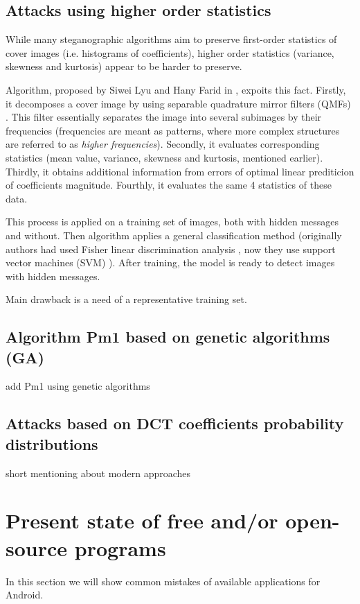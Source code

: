 \subsection{Attacks using higher order statistics}

While many steganographic algorithms aim to preserve first-order statistics of cover images
(i.e. histograms of coefficients), higher order statistics (variance, skewness and kurtosis)
appear to be harder to preserve.

Algorithm, proposed by Siwei Lyu and Hany Farid in \cite{lyu2002detecting}, expoits this fact.
Firstly, it decomposes a cover image by using separable quadrature mirror filters (QMFs) \cite{vaidyanathan1987quadrature}.
This filter essentially separates the image into several subimages by their frequencies (frequencies are meant as patterns,
where more complex structures are referred to as \emph{higher frequencies}).
Secondly, it evaluates corresponding statistics (mean value, variance, skewness and kurtosis, mentioned earlier).
Thirdly, it obtains additional information from errors of optimal linear prediticion of coefficients magnitude.
Fourthly, it evaluates the same 4 statistics of these data.

This process is applied on a training set of images, both with hidden messages and without. Then algorithm
applies a general classification method (originally authors had used Fisher linear discrimination analysis \cite{welling2005fisher}, now
they use support vector machines (SVM) \cite{vapnik2013nature}). After training, the model is ready to detect images with hidden messages.

Main drawback is a need of a representative training set. 

\subsection{Algorithm Pm1 based on genetic algorithms (GA)}


\TODO add Pm1 using genetic algorithms

\subsection{Attacks based on DCT coefficients probability distributions}
\TODO short mentioning about modern approaches

\section{Present state of free and/or open-source programs}
In this section we will show common mistakes of available applications for Android.

